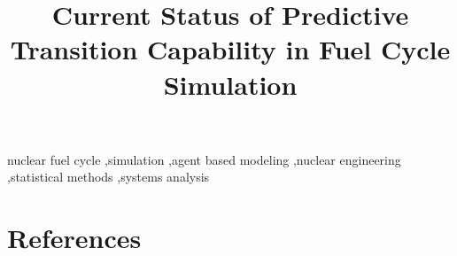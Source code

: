 \documentclass[3p,onecolumn]{elsarticle}
\begin{document}
\begin{frontmatter}

        \title{Current Status of Predictive Transition Capability in Fuel Cycle Simulation}







\begin{keyword}
nuclear fuel cycle \sep simulation \sep agent based modeling \sep nuclear 
        engineering \sep statistical methods \sep systems analysis
\end{keyword}

\end{frontmatter}




 





\nocite{*}

\section{References}

\end{document}
